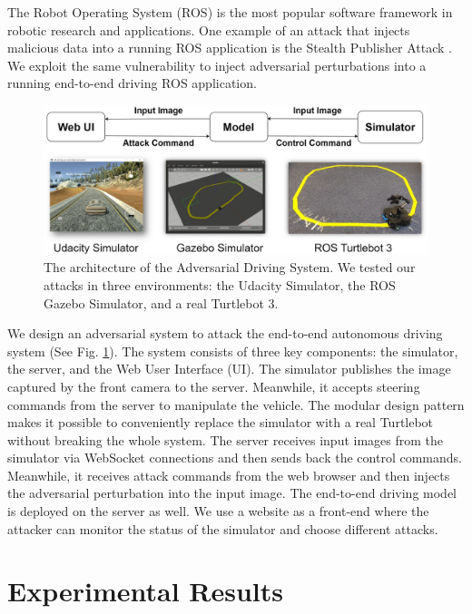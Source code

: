 The Robot Operating System (ROS) \citep{ros} is the most popular software framework in robotic research and applications. One example of an attack that
injects malicious data into a running ROS application is the Stealth Publisher Attack \citep{dieber2020penetration}. We exploit the same vulnerability to inject adversarial perturbations into a running end-to-end driving ROS application.

\begin{figure}[H]
    \centering
    \includegraphics[width=\textwidth]{figures/chapter_driving/architechture.jpg}
    \caption{The architecture of the Adversarial Driving System. We tested our attacks in three environments: the Udacity Simulator, the ROS Gazebo Simulator, and a real Turtlebot 3.}
    \label{fig:arch}
\end{figure}

We design an adversarial system to attack the end-to-end autonomous driving system (See Fig. \ref{fig:arch}). The system consists of three key components: the simulator, the server, and the Web User Interface (UI). The simulator publishes the image captured by the front camera to the server. Meanwhile, it accepts steering commands from the server to manipulate the vehicle. The modular design pattern makes it possible to conveniently replace the simulator with a real Turtlebot without breaking the whole system. The server receives input images from the simulator via WebSocket connections and then sends back the control commands. Meanwhile, it receives attack commands from the web browser and then injects the adversarial perturbation into the input image. The end-to-end driving model is deployed on the server as well. We use a website as a front-end where the attacker can monitor the status of the simulator and choose different attacks.

\section{Experimental Results}

